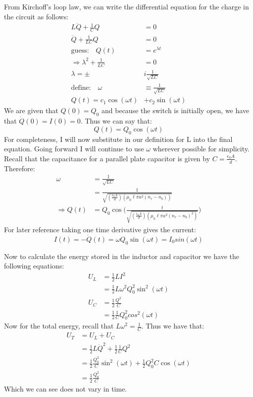 \documentclass[a4paper, 11pt]{article}
\begin{document}
\noindent From Kirchoff's loop law, we can write the differential equation for the charge in the circuit as follows: 
	\begin{align*}
		L\ddot{Q} + \frac{1}{C}Q &= 0 \\
		\ddot{Q} + \frac{1}{LC}Q &= 0 \\ 
		\text{guess:} \quad Q(t) &= e^{\lambda t}  \\ 
		\Rightarrow \lambda^2 +\frac{1}{LC} &= 0 \\ 
		\lambda = \pm &i\frac{1}{\sqrt{LC}} \\ 
		\text{define:} \quad \omega &\equiv \frac{1}{\sqrt{LC}} \\ 
		Q(t) = c_1 \cos(\omega t) &+ c_2 \sin(\omega t)
	\end{align*}
We are given that $Q(0) = Q_0$ and because the switch is initially open, we have that $\dot{Q}(0)=I(0)=0$. Thus we can say that: 
	\begin{equation*}
		Q(t) = Q_0 \cos(\omega t)
	\end{equation*}
For completeness, I will now substitute in our definition for L into the final equation. Going forward I will continue to use $\omega$ wherever possible for simplicity. Recall that the capacitance for a parallel plate capacitor is given by $C=\frac{\epsilon_0 A}{d}$. Therefore: 	
	\begin{align*}
		\omega 	&= \frac{1}{\sqrt{LC}} \\ 
				&= \frac{1}{\sqrt{(\frac{\epsilon_0 A}{d})(\mu_0 \ell \pi a^2 (n_r - n_b))}}	 \\ 
		\Rightarrow Q(t) &= Q_0 \cos\Bigg(\frac{t}{\sqrt{(\frac{\epsilon_0 A}{d})(\mu_0 \ell \pi a^2 (n_r - n_b)^2)}}\Bigg)
	\end{align*}
For later reference taking one time derivative gives the current: 
	\begin{equation*}
		I(t) = -\dot{Q}(t) = \omega Q_0 \sin(\omega t) = I_0sin(\omega t)
	\end{equation*}

Now to calculate the energy stored in the inductor and capacitor we have the following equations: 
	\begin{align*}
		U_L &= \frac{1}{2}LI^2 \\ 
			&= \frac{1}{2}L\omega^2 Q_0^2\sin^2(\omega t) \\ 
		U_C &= \frac{1}{2}\frac{Q^2}{C} \\ 
			&= \frac{1}{2}\frac{1}{C}Q_0^2cos^2(\omega t)
	\end{align*}
Now for the total energy, recall that $L\omega^2 = \frac{1}{C}$. Thus we have that: 
	\begin{align*}
		U_T &= U_L + U_C \\ 	
			&= \frac{1}{2}L\dot{Q}^2 + \frac{1}{2}\frac{1}{C}Q^2 \\ 
			&= \frac{1}{2}\frac{Q_0^2}{C}\sin^2(\omega t) + \frac{1}{2}{Q_0^2}{C}\cos(\omega t) \\ 
			&= \frac{1}{2}\frac{Q_0^2}{C}
	\end{align*}
Which we can see does not vary in time. \\ 
\end{document}
